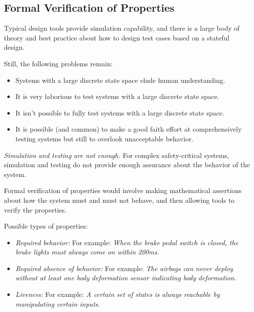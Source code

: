 \documentclass[letterpaper,10pt,titlepage]{article}
\begin{document}

\subsection{Formal Verification of Properties}
\label{staf0:svpr0}

Typical design tools provide simulation capability, and there is a large
body of theory and best practice about how to design test cases based on
a stateful design.

Still, the following problems remain:

\begin{itemize}
\item Systems with a large discrete state space elude human
      understanding.
\item It is very laborious to test systems with a large discrete
      state space.
\item It isn't possible to fully test systems with a large
      discrete state space.
\item It is possible (and common) to make a good faith effort at 
      comprehensively testing systems but still to overlook
      unacceptable behavior.
\end{itemize}

\emph{Simulation and testing are not enough.}  For complex safety-critical
systems, simulation and testing do not provide enough assurance about the
behavior of the system.

Formal verification of properties would involve making mathematical assertions
about how the system must and must not behave, and then allowing
tools to verify the properties.

Possible types of properties:

\begin{itemize}
\item \emph{Required behavior:}
      For example:  \emph{When the brake pedal switch is closed,
      the brake lights must always come on within 200ms.}
\item \emph{Required absence of behavior:}
      For example:  \emph{The airbags can never deploy without at least one
      body deformation sensor indicating body deformation.}
\item \emph{Liveness:}
      For example:  \emph{A certain set of states is always reachable by manipulating certain
      inputs.}
\end{itemize}
\end{document}
